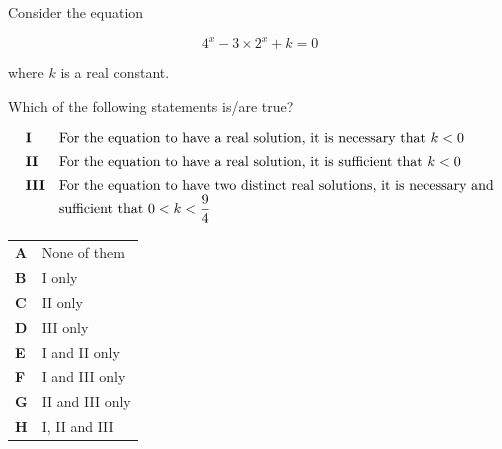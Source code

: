 \documentclass[11pt,a4paper]{article}
\begin{document}
\begin{enumerate}[label=\textbf{\arabic*.},leftmargin=*,itemsep=0pt,start=3]
\questionitem[Logic]
Consider the equation

\[
4^x - 3 \times 2^x + k = 0
\]

where $k$ is a real constant.

Which of the following statements is/are true?

\[
\begin{array}{@{}ll@{}}
\textbf{I} & \text{For the equation to have a real solution, it is necessary that } k < 0 \\[5pt]
\textbf{II} & \text{For the equation to have a real solution, it is sufficient that } k < 0 \\[5pt]
\textbf{III} & \text{For the equation to have two distinct real solutions, it is necessary and} \\
& \text{sufficient that } 0 < k < \dfrac{9}{4} \\[5pt]
\end{array}
\]

\par\vspace*{12pt}
\begin{tabularx}{\linewidth}{@{}>{\bfseries}l Y@{}}
A &
None of them
\\[0.8em]
B &
I only
\\[0.8em]
C &
II only
\\[0.8em]
D &
III only
\\[0.8em]
E &
I and II only
\\[0.8em]
F &
I and III only
\\[0.8em]
G &
II and III only
\\[0.8em]
H &
I, II and III
\\
\end{tabularx}
\end{enumerate}
\clearpage
\thispagestyle{djspaper}
\vspace*{8pt}
\end{document}
